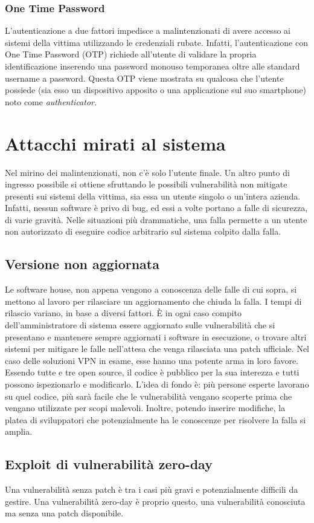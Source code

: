 \subsubsection{One Time Password}
L'autenticazione a due fattori impedisce a malintenzionati di avere accesso ai sistemi della vittima utilizzando le credenziali rubate. Infatti, l'autenticazione con One Time Password (OTP) richiede all'utente di validare la propria identificazione inserendo una password monouso temporanea oltre alle standard username a password.
Questa OTP viene mostrata su qualcosa che l'utente possiede (sia esso un dispositivo apposito o una applicazione sul suo smartphone) noto come \emph{authenticator}.


\section{Attacchi mirati al sistema}
Nel mirino dei malintenzionati, non c'è solo l'utente finale. Un altro punto di ingresso possibile si ottiene sfruttando le possibili vulnerabilità non mitigate presenti sui sistemi della vittima, sia essa un utente singolo o un'intera azienda.
Infatti, nessun software è privo di bug, ed essi a volte portano a falle di sicurezza, di varie gravità. Nelle situazioni più drammatiche, una falla permette a un utente non autorizzato di eseguire codice arbitrario sul sistema colpito dalla falla.

\subsection{Versione non aggiornata}
Le software house, non appena vengono a conoscenza delle falle di cui sopra, si mettono al lavoro per rilasciare un aggiornamento che chiuda la falla.
I tempi di rilascio variano, in base a diversi fattori. È in ogni caso compito dell'amministratore di sistema essere aggiornato sulle vulnerabilità che si presentano e mantenere sempre aggiornati i software in esecuzione, o trovare altri sistemi per mitigare le falle nell'attesa che venga rilasciata una patch ufficiale.
Nel caso delle soluzioni VPN in esame, esse hanno una potente arma in loro favore.
Essendo tutte e tre open source, il codice è pubblico per la sua interezza e tutti possono ispezionarlo e modificarlo.
L'idea di fondo è: più persone esperte lavorano su quel codice, più sarà facile che le vulnerabilità vengano scoperte prima che vengano utilizzate per scopi malevoli.
Inoltre, potendo inserire modifiche, la platea di sviluppatori che potenzialmente ha le conoscenze per risolvere la falla si amplia.

\subsection{Exploit di vulnerabilità zero-day}
Una vulnerabilità senza patch è tra i casi più gravi e potenzialmente difficili da gestire. Una vulnerabilità zero-day è proprio questo, una vulnerabilità conosciuta ma senza una patch disponibile.




